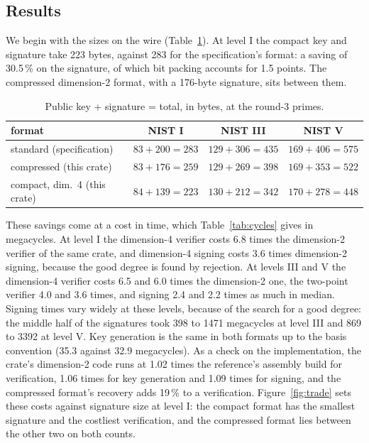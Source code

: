 \documentclass[version=preprint]{iacrcc}
\begin{document}
    \subsection{Results}
    \label{sec:results}
    We begin with the sizes on the wire (Table~\ref{tab:sizes}). At level I
    the compact key and signature take 223 bytes, against 283 for the
    specification's format: a saving of 30.5\,\% on the signature, of which
    bit packing accounts for 1.5 points. The compressed
    dimension-2 format, with a 176-byte signature, sits between them.

    \begin{table}[t]
        \centering
        \begin{threeparttable}
            \caption{Public key + signature = total, in bytes, at the round-3
                primes.}
            \label{tab:sizes}
            \footnotesize
            \setlength{\tabcolsep}{3.5pt}
            \begin{tabular}{l c c c}
                \toprule
                format & NIST I & NIST III & NIST V \\
                \midrule
                standard (specification) & $83 + 200 = 283$ & $129 + 306 = 435$ & $169 + 406 = 575$ \\
                compressed (this crate) & $83 + 176 = 259$ & $129 + 269 = 398$ & $169 + 353 = 522$ \\
                compact, dim.\ 4 (this crate) & $84 + 139 = 223$ & $130 + 212 = 342$ & $170 + 278 = 448$ \\
                
                \bottomrule
            \end{tabular}
        \end{threeparttable}
    \end{table}

    These savings come at a cost in time, which Table~\ref{tab:cycles} gives in
    megacycles. At level I the dimension-4 verifier costs 6.8 times the
    dimension-2 verifier of the same crate, and dimension-4 signing costs 3.6
    times dimension-2 signing, because the good degree is found by rejection. At levels III and V the dimension-4 verifier costs 6.5 and 6.0
    times the dimension-2 one, the two-point verifier 4.0 and 3.6 times, and
    signing 2.4 and 2.2 times as much in median. Signing times vary widely at
    these levels, because of the search for a good degree: the middle half of
    the signatures took 398 to 1471 megacycles at level III and 869 to 3392 at
    level V.
    Key generation is the same in both formats up to the basis convention
    (35.3 against 32.9 megacycles). As a check on the implementation, the
    crate's dimension-2 code runs at 1.02 times the reference's assembly build
    for verification, 1.06 times for key generation and 1.09 times for
    signing, and the compressed format's recovery adds 19\,\% to a
    verification. Figure~\ref{fig:trade} sets these costs against signature
    size at level I: the compact format has the smallest signature and the
    costliest verification, and the compressed format lies between the other
    two on both counts.
\end{document}
